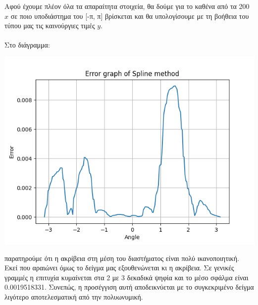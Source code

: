 \documentclass{article}
\begin{document}
Αφού έχουμε πλέον όλα τα απαραίτητα στοιχεία, θα δούμε για το καθένα από τα 200 \(x\) σε ποιο υποδιάστημα του [-π, π] βρίσκεται και θα υπολογίσουμε με τη βοήθεια του τύπου μας τις καινούργιες τιμές \(y\).\\\\
Στο διάγραμμα:
\begin{center}\includegraphics[width=\linewidth]{splines.png}\end{center}
παρατηρούμε ότι η ακρίβεια στη μέση του διαστήματος είναι πολύ ικανοποιητική. Εκεί που αραιώνει όμως το δείγμα μας εξουθενώνεται κι η ακρίβεια. Σε γενικές γραμμές η επιτυχία κυμαίνεται στα 2 με 3 δεκαδικά ψηφία και το μέσο σφάλμα είναι 0.0019518331. Συνεπώς, η προσέγγιση αυτή αποδεικνύεται με το συγκεκριμένο δείγμα λιγότερο αποτελεσματική από την πολυωνυμική.
\end{document}
